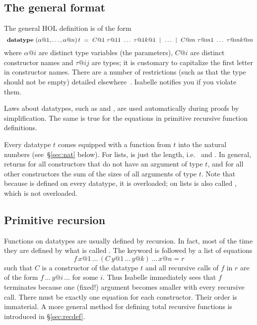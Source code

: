 \subsection{The general format}
\label{sec:general-datatype}

The general HOL  definition is of the form
\[
\isacommand{datatype}~(\alpha@1, \dots, \alpha@n) \, t ~=~
C@1~\tau@{11}~\dots~\tau@{1k@1} ~\mid~ \dots ~\mid~
C@m~\tau@{m1}~\dots~\tau@{mk@m}
\]
where $\alpha@i$ are distinct type variables (the parameters), $C@i$ are distinct
constructor names and $\tau@{ij}$ are types; it is customary to capitalize
the first letter in constructor names. There are a number of
restrictions (such as that the type should not be empty) detailed
elsewhere~\cite{isabelle-HOL}. Isabelle notifies you if you violate them.

Laws about datatypes, such as  and
, are used automatically
during proofs by simplification.  The same is true for the equations in
primitive recursive function definitions.

Every datatype $t$ comes equipped with a  function from $t$ into
the natural numbers (see~\S\ref{sec:nat} below). For lists,  is
just the length, i.e.\  and .  In general,  returns  for all constructors that do
not have an argument of type $t$, and for all other constructors 
the sum of the sizes of all arguments of type $t$. Note that because
 is defined on every datatype, it is overloaded; on lists
 is also called , which is not overloaded.


\subsection{Primitive recursion}

Functions on datatypes are usually defined by recursion. In fact, most of the
time they are defined by what is called .
The keyword  is followed by a list of
equations
\[ f \, x@1 \, \dots \, (C \, y@1 \, \dots \, y@k)\, \dots \, x@n = r \]
such that $C$ is a constructor of the datatype $t$ and all recursive calls of
$f$ in $r$ are of the form $f \, \dots \, y@i \, \dots$ for some $i$. Thus
Isabelle immediately sees that $f$ terminates because one (fixed!) argument
becomes smaller with every recursive call. There must be exactly one equation
for each constructor.  Their order is immaterial.
A more general method for defining total recursive functions is introduced in
\S\ref{sec:recdef}.

